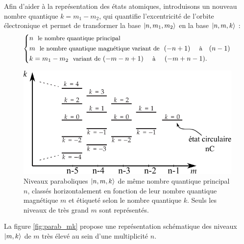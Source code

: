 Afin d'aider à la représentation des états atomiques, introduisons un nouveau nombre quantique $k=m_1-m_2$, qui quantifie l'excentricité de l'orbite électronique et permet de transformer la base $\ket{n,m_1,m_2}$ en la base $\ket{n,m,k}$ :
\begin{equation}\label{eq:base_nmk}
\left\{
\begin{aligned}
&n \text{ \begin{small}
le nombre quantique principal
\end{small}}\\
&m \text{ \begin{small}
le nombre quantique magnétique variant de
\end{small} }
(-n+1)~~ \text{ \begin{small} à \end{small}} ~~(n-1)\\
&k=m_1-m_2 \text{ \begin{small} variant de\end{small} } (-m-n+1)~~ \text{ \begin{small} à \end{small} } ~~(-m+n-1).
\end{aligned} \right.
\end{equation}
%


\begin{figure}[!h]
\centering
\includegraphics[width=.7\linewidth]{figures/echelle_parabolique_mk}
\caption[Échelle des niveaux paraboliques $\ket{n,m,k}$]{
Niveaux paraboliques $\ket{n,m,k}$ de même nombre quantique principal $n$, classés horizontalement en fonction de leur nombre quantique magnétique $m$ et étiqueté selon le nombre quantique $k$.
Seuls les niveaux de très grand $m$ sont représentés.
}
\label{fig:parab_mk}
\end{figure}

\noindent La figure \eqref{fig:parab_mk} propose une représentation schématique des niveaux $\ket{m,k}$ de $m$ très élevé au sein d'une multiplicité $n$.

